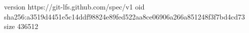 version https://git-lfs.github.com/spec/v1
oid sha256:a3519d4451e5c14ddf98824e89fed522aa8ce06906a266a851248f3f7bd4cd73
size 436512
